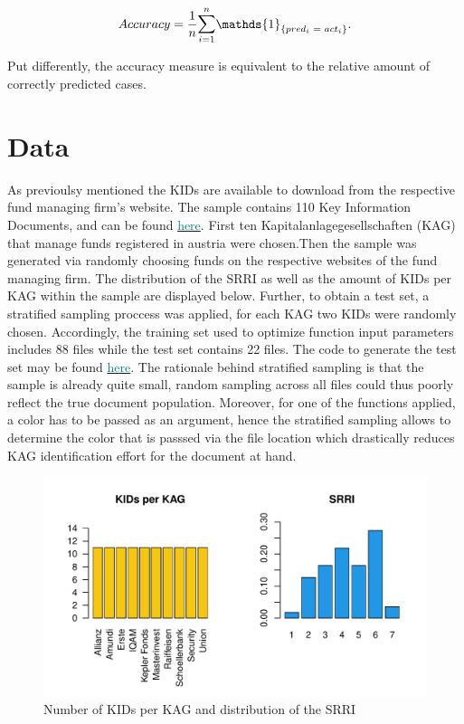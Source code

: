 \documentclass[aodsor,preprint]{imsart}
\numberwithin{equation}{section}
\theoremstyle{plain}
\begin{document}
\[
Accuracy = \frac{1}{n}\mathlarger{\sum}_{i = 1}^n\mathds{1}_{\{pred_i \text{ }= \text{ } act_i\}}\text{.}
\]

Put differently, the accuracy measure is equivalent to the relative amount of correctly predicted cases.
\newpage

\section{Data}
As previoulsy mentioned the KIDs are available to download from the respective fund managing firm's website. The  sample contains 110 Key Information Documents, and can be found \href{https://github.com/Base-R-Best-R/KID/tree/main/KIDs}{\textcolor{teal}{here}}. First ten Kapitalanlagegesellschaften (KAG) that manage funds registered in austria were chosen.Then the sample was generated via randomly choosing funds on the respective websites of the fund managing firm. The distribution of the SRRI as well as the amount of KIDs per KAG within the sample are displayed below. Further, to obtain a test set, a stratified sampling proccess was applied, for each KAG two KIDs were randomly chosen. Accordingly, the training set used to optimize function input parameters includes 88 files while the test set contains 22 files. The code to generate the test set may be found \href{https://github.com/Base-R-Best-R/KID/blob/main/Code/Package/DEV/Generate_Test_Sample.R}{\textcolor{teal}{here}}. The rationale behind stratified sampling is that the sample is already quite small, random sampling across all files could thus poorly reflect the true document population. Moreover, for one of the functions applied, a color has to be passed as an argument, hence the stratified sampling allows to determine the color that is passsed via the file location which drastically reduces KAG identification effort for the document at hand. 

\begin{figure}[H]
	\includegraphics[width = 12cm]{data_overview.pdf}
	\caption{Number of KIDs per KAG and distribution of the SRRI}
\end{figure}
\end{document}
